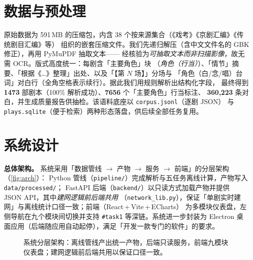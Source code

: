 \documentclass[journal]{vgtc}
\begin{document}
\section{数据与预处理}
原始数据为 591\,MB 的压缩包，内含 38 个按来源集合（《戏考》《京剧汇编》《传统剧目汇编》等）
组织的嵌套压缩文件。我们先递归解压（含中文文件名的 GBK 修正），再用 PyMuPDF 抽取文本——
经核验为\emph{可抽取文本而非扫描影像}，故无需 OCR。版式高度统一：每剧含「主要角色」块
（\emph{角色（行当）}）、「情节」摘要、「根据《\dots》整理」出处、以及「【第 $N$ 场】」分场与
「角色（白/念/唱）台词」对白行（全角空格表示续行）。据此我们用规则解析出结构化字段，
最终得到 \textbf{1473} 部剧本（100\% 解析成功）、\textbf{7656} 个「主要角色」行当标注、
\textbf{360{,}223} 条对白，并生成质量报告供抽检。该语料底座以 \texttt{corpus.jsonl}（逐剧 JSON）
与 \texttt{plays.sqlite}（便于检索）两种形态落盘，供后续全部任务复用。

\section{系统设计}
\textbf{总体架构。} 系统采用「数据管线 $\to$ 产物 $\to$ 服务 $\to$ 前端」的分层架构（\autoref{fig:arch}）：
Python 管线（\texttt{pipeline/}）完成解析与五任务离线计算，产物写入 \texttt{data/processed/}；
FastAPI 后端（\texttt{backend/}）以只读方式加载产物并提供 JSON API，其中\emph{建网逻辑前后端共用}
（\texttt{network\_lib.py}），保证「单剧实时建网」与离线统计口径一致；前端（React\,+\,Vite\,+\,ECharts）
为多模块仪表盘，左侧导航在九个模块间切换并支持 \texttt{\#task1} 等深链。系统进一步封装为 Electron
桌面应用（后端随应用自动起停），满足「开发一款专门的软件」的要求。

\begin{figure}[tb]
 \centering
 \caption{系统分层架构：离线管线产出统一产物，后端只读服务，前端九模块仪表盘；建网逻辑前后端共用以保证口径一致。}
 \label{fig:arch}
\end{figure}
\end{document}
